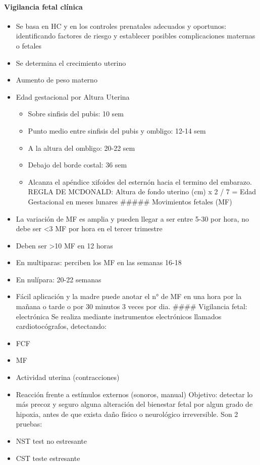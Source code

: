 \documentclass[
]{article}
\providecommand{\tightlist}{%
  \setlength{\itemsep}{0pt}\setlength{\parskip}{0pt}}
\begin{document}
\hypertarget{vigilancia-fetal-cluxednica}{%
\paragraph{Vigilancia fetal clínica}\label{vigilancia-fetal-cluxednica}}

\begin{itemize}
\tightlist
\item
  Se basa en HC y en los controles prenatales adecuados y oportunos:
  identificando factores de riesgo y establecer posibles complicaciones
  maternas o fetales
\item
  Se determina el crecimiento uterino
\item
  Aumento de peso materno
\item
  Edad gestacional por Altura Uterina

  \begin{itemize}
  \tightlist
  \item
    Sobre sinfisis del pubis: 10 sem
  \item
    Punto medio entre sinfisis del pubis y ombligo: 12-14 sem
  \item
    A la altura del ombligo: 20-22 sem
  \item
    Debajo del borde costal: 36 sem
  \item
    Alcanza el apéndice xifoides del esternón hacia el termino del
    embarazo. REGLA DE MCDONALD: Altura de fondo uterino (cm) x 2 / 7 =
    Edad Gestacional en meses lunares \#\#\#\#\# Movimientos fetales
    (MF)
  \end{itemize}
\item
  La variación de MF es amplia y pueden llegar a ser entre 5-30 por
  hora, no debe ser \textless3 MF por hora en el tercer trimestre
\item
  Deben ser \textgreater10 MF en 12 horas
\item
  En multiparas: perciben los MF en las semanas 16-18
\item
  En nulípara: 20-22 semanas
\item
  Fácil aplicación y la madre puede anotar el n° de MF en una hora por
  la mañana o tarde o por 30 minutos 3 veces por dia. \#\#\#\#
  Vigilancia fetal: electrónica Se realiza mediante instrumentos
  electrónicos llamados cardiotocógrafos, detectando:
\item
  FCF
\item
  MF
\item
  Actividad uterina (contracciones)
\item
  Reacción frente a estímulos externos (sonoros, manual) Objetivo:
  detectar lo más precoz y seguro alguna alteración del bienestar fetal
  por algun grado de hipoxia, antes de que exista daño físico o
  neurológico irreversible. Son 2 pruebas:
\item
  NST test no estresante
\item
  CST teste estresante
\end{itemize}
\end{document}
